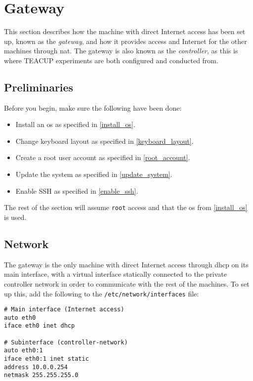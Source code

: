 \chapter{Gateway}

This section describes how the machine with direct Internet access has been set up, known as the \textit{gateway}, and how it provides access and Internet for the other machines through \gls{nat}. The gateway is also known as the \textit{controller}, as this is where TEACUP experiments are both configured and conducted from.

\section{Preliminaries}

Before you begin, make sure the following have been done:

\begin{itemize}
    \item Install an \gls{os} as specified in \ref{install_os}.
    \item Change keyboard layout as specified in \ref{keyboard_layout}.
    \item Create a root user account as specified in \ref{root_account}.
    \item Update the system as specified in \ref{update_system}.
    \item Enable SSH as specified in \ref{enable_ssh}.
\end{itemize}

The rest of the section will assume \lstinline{root} access and that the \gls{os} from \ref{install_os} is used.


\section{Network}

The gateway is the only machine with direct Internet access through \gls{dhcp} on its main interface, with a virtual interface statically connected to the private controller network in order to communicate with the rest of the machines. To set up this, add the following to the \lstinline{/etc/network/interfaces} file:

\begin{lstlisting}
# Main interface (Internet access)
auto eth0
iface eth0 inet dhcp

# Subinterface (controller-network)
auto eth0:1
iface eth0:1 inet static
address 10.0.0.254
netmask 255.255.255.0
\end{lstlisting}

